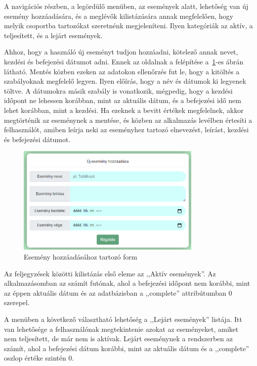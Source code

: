 \documentclass[
]{thesis-ekf}
\theoremstyle{definition}
\theoremstyle{remark}
\begin{document}
	A navigációs részben, a legördülő menüben, az események alatt, lehetőség van új esemény hozzáadására, és a meglévők kilistázására annak megfelelően, hogy melyik csoportba tartozókat szeretnénk megjeleníteni. Ilyen kategóriák az aktív, a teljesített, és a lejárt események. 
	
	Ahhoz, hogy a használó új eseményt tudjon hozzáadni, kötelező annak nevet, kezdési és befejezési dátumot adni. Ennek az oldalnak a felépítése a~\ref{figure:web_add_event}-es ábrán látható. Mentés közben ezeken az adatokon ellenőrzés fut le, hogy a kitöltés a szabályoknak megfelelő legyen. Ilyen előírás, hogy a név és dátumok ki legyenek töltve. A dátumokra másik szabály is vonatkozik, mégpedig, hogy a kezdési időpont ne lehessen korábban, mint az aktuális dátum, és a befejezési idő nem lehet korábban, mint a kezdési. Ha ezeknek a bevitt értékek megfelelnek, akkor megtörténik az eseménynek a mentése, és közben az alkalmazás levélben értesíti a felhasználót, amiben leírja neki az eseményhez tartozó elnevezést, leírást, kezdési és befejezési dátumot. 
	
	\begin{figure}[ht!]
		\centering
		\includegraphics[width=0.8\textwidth]{web_app/web_add_event}
		\caption{Esemény hozzáadásához tartozó form}
		\label{figure:web_add_event}
	\end{figure}
	
	Az feljegyzések közötti kilistázás első eleme az ,,Aktív események''. Az alkalmazásomban az számít futónak, ahol a befejezési időpont nem korábbi, mint az éppen aktuális dátum és az adatbázisban a ,,complete''  attribútumban 0 szerepel.
	
	A menüben a következő választható lehetőség a ,,Lejárt események'' listája. Itt van lehetősége a felhasználónak megtekintenie azokat az eseményeket, amiket nem teljesített, de már nem is aktívak. Lejárt eseménynek a rendszerben az számít, ahol a befejezési dátum korábbi, mint az aktuális dátum és a ,,complete'' oszlop értéke szintén 0. 
	
\end{document}
